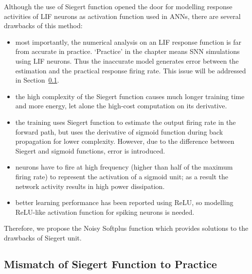 	Although the use of Siegert function opened the door for modelling response activities of LIF neurons as activation function used in ANNs, there are several drawbacks of this method:
	\begin{itemize}
		\item most importantly, the numerical analysis on an LIF response function is far from accurate in practice. `Practice' in the chapter means SNN simulations using LIF neurons.
		Thus the inaccurate model generates error between the estimation and the practical response firing rate.
		This issue will be addressed in Section~\ref{subsec:practice}.
		
		
		\item the high complexity of the Siegert function causes much longer training time and more energy, let alone the high-cost computation on its derivative.
		\item the training uses Siegert function to estimate the output firing rate in the forward path, but uses the derivative of sigmoid function during back propagation for lower complexity.
		However, due to the difference between Siegert and sigmoid functions, error is introduced. 
		\item neurons have to fire at high frequency (higher than half of the maximum firing rate) to represent the activation of a sigmoid unit; as a result the network activity results in high power dissipation.
		\item better learning performance has been reported using ReLU, so modelling ReLU-like activation function for spiking neurons is needed.  
	\end{itemize}
	
	Therefore, we propose the Noisy Softplus function which provides solutions to the drawbacks of Siegert unit.
	
	\subsection{Mismatch of Siegert Function to Practice}
	\label{subsec:practice}
	
